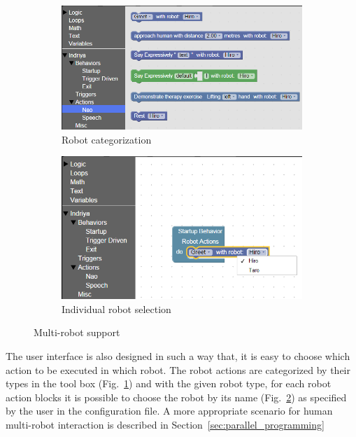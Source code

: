 \begin{figure}
\centering
\begin{subfigure}[t]{0.8\textwidth}
\includegraphics[width=\textwidth]{../thesis/assets/toolbox_multirobot.png}
\caption[Robot categorization]{Robot categorization}
\label{fig:robot_categorize}
\end{subfigure}

\begin{subfigure}[t]{0.8\textwidth}
\includegraphics[width=\textwidth]{../thesis/assets/toolbox_multirobot2.png}
\caption[Individual robot selection]{Individual robot selection}
\label{fig:robot_selection}
\end{subfigure}
\caption[Multi-robot support]{Multi-robot support}
\label{fig:multirobot_support}
\end{figure}
The user interface is also designed in such a way that, it is easy to choose which action to be executed in which robot. The robot actions are categorized by their types in the tool box (Fig.~\ref{fig:robot_categorize}) and with the given robot type, for each robot action blocks it is possible to choose the robot by its name (Fig.~\ref{fig:robot_selection}) as specified by the user in the configuration file.
A more appropriate scenario for human multi-robot interaction is described in Section~\ref{sec:parallel_programming}

